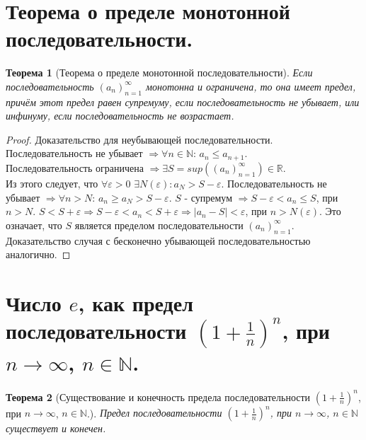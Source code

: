 \documentclass[11pt,a4paper,titlepage]{article}
\newtheorem*{theorem}{Теорема}
\renewcommand{\epsilon}{\varepsilon}
\newcommand{\R}{\mathbb{R}}
\newcommand{\N}{\mathbb{N}}
\begin{document}
    \section{Теорема о пределе монотонной последовательности.}

    \begin{theorem}[Теорема о пределе монотонной последовательности]
        Если последовательность $(a_n)_{n=1}^\infty$ монотонна и ограничена, то она имеет предел, причём этот предел равен супремуму, если последовательность не убывает, или инфинуму, если последовательность не возрастает.
    \end{theorem}

    \begin{proof}
        Доказательство для неубывающей последовательности.\\
        Последовательность не убывает $\Rightarrow \forall n \in \N$: $a_n \leq a_{n+1}$.\\
        Последовательность ограничена $\Rightarrow \exists S = sup((a_n)_{n=1}^\infty) \in \R $.\\
        Из этого следует, что $\forall \epsilon > 0$ $\exists N(\epsilon): a_N > S - \epsilon$. Последовательность не убывает $\Rightarrow \forall n > N$: $a_n \geq a_N > S-\epsilon$. $S$ - супремум $\Rightarrow S - \epsilon < a_n \leq S$, при $n > N$. $S < S + \epsilon \Rightarrow S-\epsilon < a_n < S+\epsilon \Rightarrow |a_n - S| < \epsilon$, при $n > N(\epsilon)$. Это означает, что $S$ является пределом последовательности $(a_n)_{n=1}^\infty$. Доказательство случая с бесконечно убывающей последовательностью аналогично.
    \end{proof}


    \section{Число $e$, как предел последовательности $(1 + \frac{1}{n})^n$, при $n \rightarrow \infty$, $n \in \N$.}

    \begin{theorem}%
    [Существование и конечность предела последовательности $(1 + \frac{1}{n})^n$, при $n \rightarrow \infty$, $n \in \N$.]
        Предел последовательности $(1 + \frac{1}{n})^n$, при $n \rightarrow \infty$, $n \in \N$ существует и конечен.
    \end{theorem}
\end{document}
